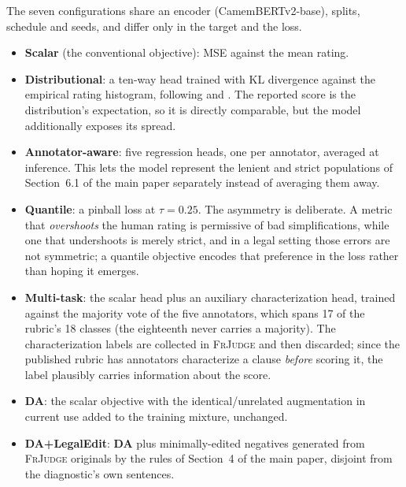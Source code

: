 \documentclass[11pt]{article}
\begin{document}
The seven configurations share an encoder (CamemBERTv2-base), splits, schedule
and seeds, and differ only in the target and the loss.

\begin{itemize}\itemsep2pt
\item \textbf{Scalar} (the conventional objective): MSE against the mean rating.
\item \textbf{Distributional}: a ten-way head trained with KL divergence against
      the empirical rating histogram, following \citet{uma2021learning} and
      \citet{peterson2019human}. The reported score is the distribution's
      expectation, so it is directly comparable, but the model additionally
      exposes its spread.
\item \textbf{Annotator-aware}: five regression heads, one per annotator,
      averaged at inference. This lets the model represent the lenient and
      strict populations of Section~6.1 of the main paper separately instead of
      averaging them away.
\item \textbf{Quantile}: a pinball loss \citep{koenker1978regression} at
      $\tau=0.25$. The asymmetry is deliberate. A metric that
      \emph{overshoots} the human rating is permissive of bad simplifications,
      while one that undershoots is merely strict, and in a legal setting those
      errors are not symmetric; a quantile objective encodes that preference in
      the loss rather than hoping it emerges.
\item \textbf{Multi-task}: the scalar head plus an auxiliary characterization
      head, trained against the majority vote of the five annotators, which
      spans 17 of the rubric's 18 classes (the eighteenth never carries a
      majority). The characterization labels are collected in \textsc{FrJudge}
      and then discarded; since the published rubric has annotators characterize
      a clause \emph{before} scoring it, the label plausibly carries information
      about the score.
\item \textbf{DA}: the scalar objective with the identical/unrelated
      augmentation in current use added to the training mixture, unchanged.
\item \textbf{DA+LegalEdit}: \textbf{DA} plus minimally-edited negatives
      generated from \textsc{FrJudge} originals by the rules of
      Section~4 of the main paper, disjoint from the diagnostic's own sentences.
\end{itemize}
\end{document}
